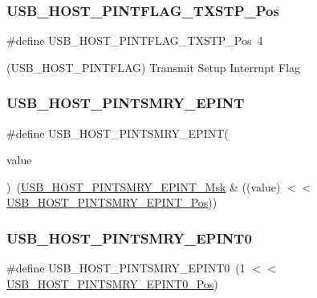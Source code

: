 \subsubsection{\texorpdfstring{USB\_HOST\_PINTFLAG\_TXSTP\_Pos}{USB\_HOST\_PINTFLAG\_TXSTP\_Pos}}
{\footnotesize\ttfamily \#define U\+S\+B\+\_\+\+H\+O\+S\+T\+\_\+\+P\+I\+N\+T\+F\+L\+A\+G\+\_\+\+T\+X\+S\+T\+P\+\_\+\+Pos~4}



(U\+S\+B\+\_\+\+H\+O\+S\+T\+\_\+\+P\+I\+N\+T\+F\+L\+AG) Transmit Setup Interrupt Flag 

\mbox{\label{group___s_a_m_d21___u_s_b_gaa203108a24e80730803b94fe30fd44b6}} 
\subsubsection{\texorpdfstring{USB\_HOST\_PINTSMRY\_EPINT}{USB\_HOST\_PINTSMRY\_EPINT}}
{\footnotesize\ttfamily \#define U\+S\+B\+\_\+\+H\+O\+S\+T\+\_\+\+P\+I\+N\+T\+S\+M\+R\+Y\+\_\+\+E\+P\+I\+NT(\begin{DoxyParamCaption}\item[{}]{value }\end{DoxyParamCaption})~(\mbox{\hyperlink{group___s_a_m_d21___u_s_b_gaaf6d2ae6a79c4c0d5f623fa966aac15d}{U\+S\+B\+\_\+\+H\+O\+S\+T\+\_\+\+P\+I\+N\+T\+S\+M\+R\+Y\+\_\+\+E\+P\+I\+N\+T\+\_\+\+Msk}} \& ((value) $<$$<$ \mbox{\hyperlink{group___s_a_m_d21___u_s_b_ga8190d68c8a2825f05d0c3fcfe946fc2b}{U\+S\+B\+\_\+\+H\+O\+S\+T\+\_\+\+P\+I\+N\+T\+S\+M\+R\+Y\+\_\+\+E\+P\+I\+N\+T\+\_\+\+Pos}}))}

\mbox{\label{group___s_a_m_d21___u_s_b_gacd579a37a9c319ef0e639210fdbb0013}} 
\subsubsection{\texorpdfstring{USB\_HOST\_PINTSMRY\_EPINT0}{USB\_HOST\_PINTSMRY\_EPINT0}}
{\footnotesize\ttfamily \#define U\+S\+B\+\_\+\+H\+O\+S\+T\+\_\+\+P\+I\+N\+T\+S\+M\+R\+Y\+\_\+\+E\+P\+I\+N\+T0~(1 $<$$<$ \mbox{\hyperlink{group___s_a_m_d21___u_s_b_ga6657a88e54f315a23ad5bd37cb6e935c}{U\+S\+B\+\_\+\+H\+O\+S\+T\+\_\+\+P\+I\+N\+T\+S\+M\+R\+Y\+\_\+\+E\+P\+I\+N\+T0\+\_\+\+Pos}})}

